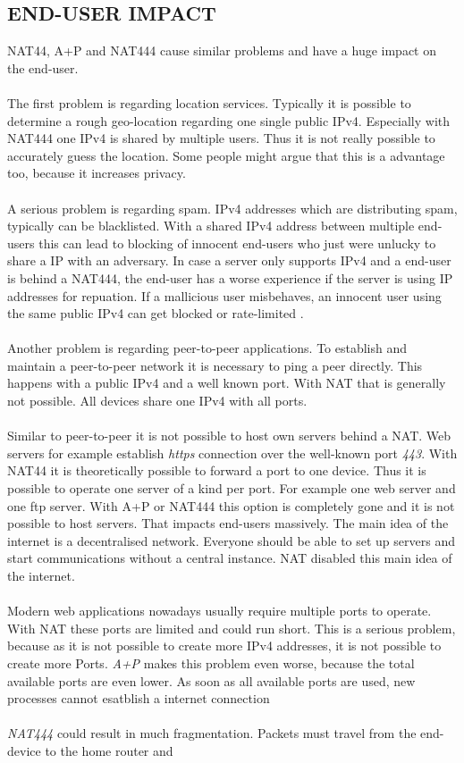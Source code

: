 \documentclass[format=sigconf, natbib=true, nonacm=true]{acmart}
\begin{document}
    \subsection*{END-USER IMPACT}
    NAT44, A+P and NAT444 cause similar problems and have a huge impact on the end-user.\\\\The first problem is regarding location services. Typically it is possible to determine a rough geo-location regarding one single public IPv4. Especially with NAT444 one IPv4 is shared by multiple users. Thus it is not really possible to accurately guess the location. Some people might argue that this is a advantage too, because it increases privacy\cite{Hughes2022_C04}.\\\\A serious problem is regarding spam. IPv4 addresses which are distributing spam, typically can be blacklisted. With a shared IPv4 address between multiple end-users this can lead to blocking of innocent end-users who just were unlucky to share a IP with an adversary. In case a server only supports IPv4 and a end-user is behind a NAT444, the end-user has a worse experience if the server is using IP addresses for repuation. If a mallicious user misbehaves, an innocent user using the same public IPv4 can get blocked or rate-limited \cite{Hughes2022_C04}.\\\\Another problem is regarding peer-to-peer applications. To establish and maintain a peer-to-peer network it is necessary to ping a peer directly. This happens with a public IPv4 and a well known port. With NAT that is generally not possible. All devices share one IPv4 with all ports\cite{Hughes2022_C04}.\\\\Similar to peer-to-peer it is not possible to host own servers behind a NAT. Web servers for example establish \textit{https} connection over the well-known port \textit{443}. With NAT44 it is theoretically possible to forward a port to one device. Thus it is possible to operate one server of a kind per port. For example one web server and one ftp server. With A+P or NAT444 this option is completely gone and it is not possible to host servers. That impacts end-users massively. The main idea of the internet is a decentralised network. Everyone should be able to set up servers and start communications without a central instance. NAT disabled this main idea of the internet\cite{Hughes2022_C04}.\\\\Modern web applications nowadays usually require multiple ports to operate. With NAT these ports are limited and could run short. This is a serious problem, because as it is not possible to create more IPv4 addresses, it is not possible to create more Ports\cite{Hughes2022_C04}. \textit{A+P} makes this problem even worse, because the total available ports are even lower. As soon as all available ports are used, new processes cannot esatblish a internet connection\\\\ \textit{NAT444} could result in much fragmentation. Packets must travel from the end-device to the home router and 
\end{document}
